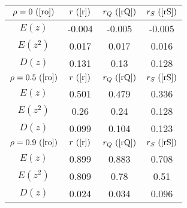 \begin{tabular}{|c|c|c|c|}
\hline
$\rho = 0~(\ref{ro})$ & $r ~(\ref{r})$ & $r_Q ~(\ref{rQ})$ & $r_S ~(\ref{rS})$\\
\hline
$E(z)$ & -0.004 & -0.005 & -0.005\\
\hline
$E(z^2)$ & 0.017 & 0.017 & 0.016\\
\hline
$D(z)$ & 0.131 & 0.13 & 0.128\\
\hline
$\rho = 0.5~(\ref{ro})$ & $r ~(\ref{r})$ & $r_Q ~(\ref{rQ})$ & $r_S ~(\ref{rS})$\\
\hline
$E(z)$ & 0.501 & 0.479 & 0.336\\
\hline
$E(z^2)$ & 0.26 & 0.24 & 0.128\\
\hline
$D(z)$ & 0.099 & 0.104 & 0.123\\
\hline
$\rho = 0.9~(\ref{ro})$ & $r ~(\ref{r})$ & $r_Q ~(\ref{rQ})$ & $r_S ~(\ref{rS})$\\
\hline
$E(z)$ & 0.899 & 0.883 & 0.708\\
\hline
$E(z^2)$ & 0.809 & 0.78 & 0.51\\
\hline
$D(z)$ & 0.024 & 0.034 & 0.096\\
\hline
\end{tabular}